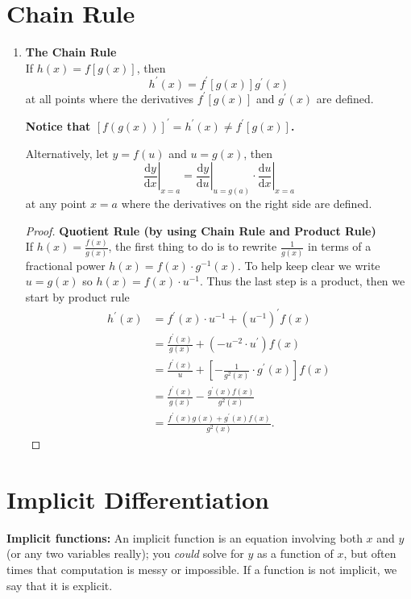 \section{Chain Rule}
\begin{enumerate}
    \item \textbf{The Chain Rule}\\
        \indent If \(h(x)=f[g(x)]\), then
        \[
            h^\prime (x)=f^\prime [g(x)]g^\prime (x)
        \]
        at all points where the derivatives \(f^\prime [g(x)]\) and \(g^\prime (x)\) are defined.
        \begin{note}
            \textbf{Notice that \([f(g(x))]^\prime=h^\prime (x)\neq f^\prime[g(x)]\).}
        \end{note}
        Alternatively, let \(y=f(u)\) and \(u=g(x)\), then
        \[
            \left.\frac{\mathrm{d}y}{\mathrm{d}x}\right|_{x=a}=\left.\frac{\mathrm{d}y}{\mathrm{d}u}\right|_{u=g(a)}\cdot\left.\frac{\mathrm{d}u}{\mathrm{d}x}\right|_{x=a}
        \]
        at any point \(x=a\) where the derivatives on the right side are defined.
        \begin{proof}
            \textbf{Quotient Rule (by using Chain Rule and Product Rule)}\\
            \indent If \(h(x)=\frac{f(x)}{g(x)}\), the first thing to do is to rewrite \(\frac{1}{g(x)}\) in terms of a fractional power \(h(x)=f(x)\cdot g^{-1}(x)\). To help keep clear we write \(u=g(x)\) so \(h(x)=f(x)\cdot u^{-1}\). Thus the last step is a product, then we start by product rule
            \begin{align*}
                h^\prime (x) & =f^\prime (x)\cdot u^{-1}+(u^{-1})^\prime f(x)\\
                             & =\frac{f^\prime (x)}{g(x)}+(-u^{-2}\cdot u^\prime)f(x)\\
                             & =\frac{f^\prime (x)}{u}+[-\frac{1}{g^2(x)}\cdot g^\prime (x)]f(x)\\
                             & =\frac{f^\prime (x)}{g(x)}-\frac{g^\prime (x)f(x)}{g^2(x)}\\
                             & =\frac{f^\prime (x)g(x)+g^\prime (x)f(x)}{g^2(x)}.
            \end{align*}
        \end{proof}
\end{enumerate}

\section{Implicit Differentiation}
\begin{note}\textbf{Implicit functions:} An implicit function is an equation involving both \(x\) and \(y\) (or any two variables really); you \textit{could} solve for \(y\) as a function of \(x\), but often times that computation is messy or impossible. If a function is not implicit, we say that it is explicit.
\end{note}

